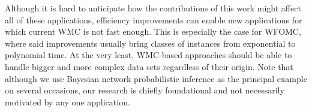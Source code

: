 Although it is hard to anticipate how the contributions of this work might
affect all of these applications, efficiency improvements can enable new
applications for which current WMC is not fast enough. This is especially the
case for WFOMC, where said improvements usually bring classes of instances from
exponential to polynomial time. At the very least, WMC-based approaches should
be able to handle bigger and more complex data sets regardless of their origin.
Note that although we use Bayesian network probabilistic inference as the
principal example on several occasions, our research is chiefly foundational and
not necessarily motivated by any one application.

